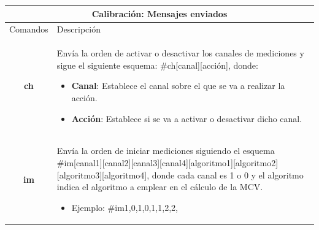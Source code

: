 \newpage
\vspace*{60pt}
\begin{table}[h]
    \centering
    \begin{tabular}{ |c|p{14cm}|}
        \hline
        \multicolumn{2}{|c|}{Calibración: Mensajes enviados} \\
        \hline
        Comandos        &   Descripción \\\hline
        \textbf{ch}     &   \begin{minipage}{14cm}
                                \vspace{1pt}
                                Envía la orden de activar o desactivar los canales de mediciones y sigue 
                                el siguiente esquema: \#ch[canal][acción], donde:
                                \begin{itemize}
                                    \item \textbf{Canal}: Establece el canal sobre el que se va a realizar la acción.
                                    \item \textbf{Acción}: Establece si se va a activar o desactivar dicho canal. 
                                \end{itemize}
                                \vspace{1pt}
                            \end{minipage}\\\hline
        \textbf{im}     &   \begin{minipage}{14cm}
                                \vspace{1pt}
                                Envía la orden de iniciar mediciones siguiendo el esquema 
                                \#im[canal1][canal2][canal3][canal4][algoritmo1][algoritmo2][algoritmo3][algoritmo4], donde cada canal es 1 o 0 y el algoritmo indica el algoritmo a emplear en el cálculo de la MCV.
                                \begin{itemize}
                                    \item Ejemplo: \#im1,0,1,0,1,1,2,2,
                                \end{itemize}   
                                \vspace{1pt}

\end{minipage}
\end{tabular}
\end{table}
